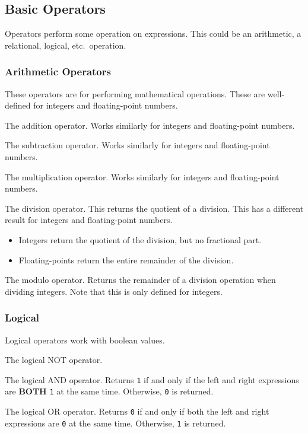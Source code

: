 \subsection{Basic Operators}\label{subsec:Basic_Operators}
Operators perform some operation on expressions.
This could be an arithmetic, a relational, logical, etc.\ operation.

\subsubsection{Arithmetic Operators}\label{subsubsec:Arithmetic_Operators}
These operators are for performing mathematical operations.
These are well-defined for integers and floating-point numbers.

\begin{description}[noitemsep]
\item[\cinline{+}] The addition operator.
  Works similarly for integers and floating-point numbers.

\item[\cinline{-}] The subtraction operator.
  Works similarly for integers and floating-point numbers.

\item[\cinline{*}] The multiplication operator.
  Works similarly for integers and floating-point numbers.

\item[\cinline{/}] The division operator.
  This returns the quotient of a division.
  This has a different result for integers and floating-point numbers.
  \begin{itemize}[noitemsep]
  \item Integers return the quotient of the division, but no fractional part.
  \item Floating-points return the entire remainder of the division.
  \end{itemize}

\item[\texttt{\%}] The modulo operator.
  Returns the remainder of a division operation when dividing integers.
  Note that this is only defined for integers.
\end{description}

\subsubsection{Logical}\label{subsubsec:Logical_Operators}
Logical operators work with boolean values.
\begin{description}[noitemsep]
\item[\cinline{!}] The logical NOT operator.
\item[\cinline{&&}] The logical AND operator.
  Returns \texttt{1} if and only if the left and right expressions are \textbf{BOTH} \texttt{1} at the same time.
  Otherwise, \texttt{0} is returned.
\item[\cinline{||}] The logical OR operator.
  Returns \texttt{0} if and only if both the left and right expressions are \texttt{0} at the same time.
  Otherwise, \texttt{1} is returned.
\end{description}

